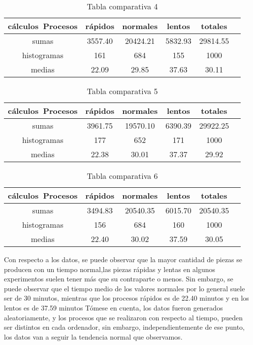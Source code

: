 \documentclass{article}
\begin{document}
\begin{table}[H]
    \centering
    \caption{Tabla comparativa 4}
    \begin{tabular}{cccccc}
        \toprule
       cálculos\ Procesos & rápidos & normales & lentos & totales \\
        \midrule
    sumas &   3557.40       & 20424.21       & 5832.93       & 29814.55           \\
    histogramas &   161       & 684       & 155          & 1000            \\
    medias &   22.09       & 29.85       & 37.63         & 30.11            \\
        \bottomrule
    \end{tabular}
\end{table}
\begin{table}[H]
    \centering
    \caption{Tabla comparativa 5}
    \begin{tabular}{cccccc}
        \toprule
       cálculos\ Procesos & rápidos & normales & lentos & totales \\
        \midrule
    sumas &   3961.75       & 19570.10       & 6390.39       & 29922.25           \\
    histogramas &   177       & 652       & 171          & 1000            \\
    medias &   22.38       & 30.01       & 37.37         & 29.92            \\
        \bottomrule
    \end{tabular}
\end{table}

\begin{table}[H]
    \centering
    \caption{Tabla comparativa 6}
    \begin{tabular}{cccccc}
        \toprule
       cálculos\ Procesos & rápidos & normales & lentos & totales \\
        \midrule
    sumas &   3494.83       & 20540.35       & 6015.70  & 20540.35           \\
    histogramas &   156       & 684       & 160          & 1000            \\
    medias &   22.40       & 30.02       & 37.59         & 30.05            \\
        \bottomrule
    \end{tabular}
\end{table}
Con respecto a los datos, se puede observar que la mayor cantidad de piezas se producen con un tiempo normal,las piezas rápidas y lentas en algunos experimentos suelen tener más que su contraparte o menos. Sin embargo, se puede observar que el tiempo medio de los valores normales por lo general suele ser de 30 minutos, mientras que los procesos rápidos es de 22.40 minutos y en los lentos es de 37.59 minutos
Tómese en cuenta, los datos fueron generados aleatoriamente, y los procesos que se realizaron con respecto al tiempo, pueden ser distintos en cada ordenador, sin embargo, independientemente de ese punto, los datos van a seguir la tendencia normal que observamos.
\end{document}
